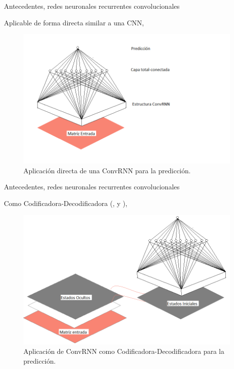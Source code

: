 \begin{frame}{Antecedentes, redes neuronales recurrentes convolucionales}
    \begin{block}{Aplicable de forma directa similar a una CNN,}
    \begin{figure}
        \centering
        \includegraphics[scale=0.4]{animate/conv_lstm.png}
        \caption{Aplicación directa de una ConvRNN para la predicción.}
        \label{fig:convrnn}
    \end{figure}
    \end{block}
\end{frame}

\begin{frame}{Antecedentes, redes neuronales recurrentes convolucionales}
    \begin{block}{Como Codificadora-Decodificadora (\cite{convlstm}, \cite{E-D1} y \cite{E-D2}),}
    \begin{figure}
        \centering
        \includegraphics[scale=0.4]{animate/Codificador-Decodificador.png}
        \caption{Aplicación de ConvRNN como Codificadora-Decodificadora para la predicción.}
        \label{fig:my_label}
    \end{figure}
    \end{block}
\end{frame}

